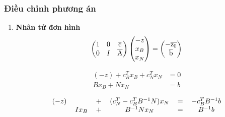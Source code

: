 \documentclass{article}
\begin{document}
        \subsubsection{Điều chỉnh phương án}
            \begin{enumerate}
                \item \textbf{Nhân tử đơn hình}
                    \begin{gather}
                        \begin{pmatrix} 
                            1 & 0 & \overline{\rm c} \\
                            0 & I & \overline{\rm A} \\
                        \end{pmatrix}
                        \begin{pmatrix}
                            -z \\
                            x_{B} \\
                            x_{N} \\
                        \end{pmatrix}
                        =
                        \begin{pmatrix}
                            - \overline{\rm z_{0}} \\
                            \overline{\rm b}
                        \end{pmatrix}
                    \end{gather}

                    \begin{equation}
                        \begin{split}
                            (-z) + c^T_B x_B + c^T_N x_N &= 0 \\
                            B x_B + N x_N &= b
                        \end{split}
                    \end{equation}

                    \begin{equation}
                        \begin{tabular} {cccccc}
                            $(-z)$ &&$+$& $(c^T_N - c^T_B B^{-1} N) x_N$ &$=$& $-c^T_B B^{-1} b$ \\
                            & $Ix_B$ &$+$& $B^{-1} N x_N$ &$=$& $B^{-1}b$
                        \end{tabular}
                    \end{equation}


\end{enumerate}
\end{document}
